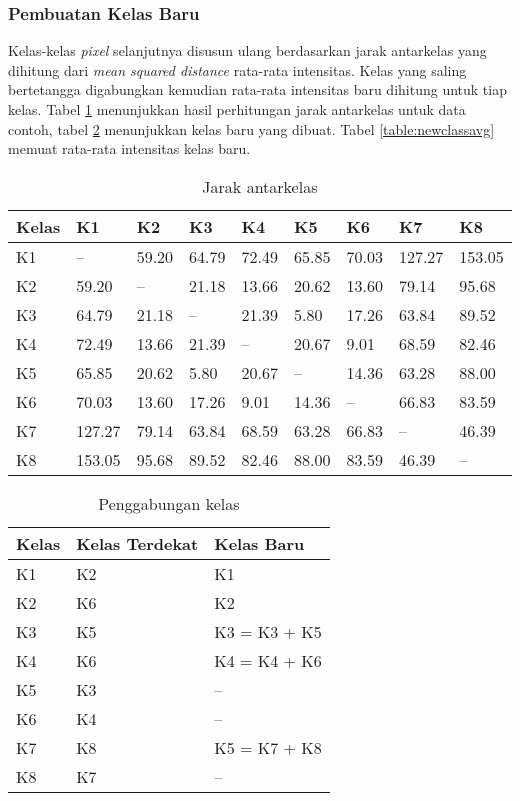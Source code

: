 \documentclass[laporan.tex]{subfiles}
\begin{document}
\subsubsection{Pembuatan Kelas Baru}

Kelas-kelas \emph{pixel} selanjutnya disusun ulang berdasarkan jarak antarkelas yang dihitung dari \emph{mean squared distance} rata-rata intensitas. Kelas yang saling bertetangga digabungkan kemudian rata-rata intensitas baru dihitung untuk tiap kelas. Tabel \ref{table:clsdist} menunjukkan hasil perhitungan jarak antarkelas untuk data contoh, tabel \ref{table:newclass} menunjukkan kelas baru yang dibuat. Tabel \ref{table:newclassavg} memuat rata-rata intensitas kelas baru.


\begin{table}[h]
\centering
\begin{tabular}{|l|l|l|l|l|l|l|l|l|}
\hline
Kelas & K1 & K2 & K3 & K4 & K5 & K6 & K7 & K8 \\
\hline
K1 & -- & 59.20 & 64.79 & 72.49 & 65.85 & 70.03 & 127.27 & 153.05 \\
K2 & 59.20 & -- & 21.18 & 13.66 & 20.62 & 13.60 & 79.14 & 95.68 \\
K3 & 64.79 & 21.18 & --	& 21.39 & 5.80 & 17.26 & 63.84 & 89.52 \\
K4 & 72.49 & 13.66 & 21.39 & --	& 20.67 & 9.01 & 68.59 & 82.46 \\
K5 & 65.85 & 20.62 & 5.80 & 20.67 & -- & 14.36 & 63.28 & 88.00 \\
K6 & 70.03 & 13.60 & 17.26 & 9.01 & 14.36 & -- & 66.83 & 83.59 \\
K7 & 127.27 & 79.14 & 63.84 & 68.59 & 63.28 & 66.83 & -- & 46.39 \\
K8 & 153.05 & 95.68 & 89.52 & 82.46 & 88.00 & 83.59 & 46.39 & -- \\
\hline
\end{tabular}
\caption{Jarak antarkelas}
\label{table:clsdist}
\end{table}

\begin{table}[h]
\centering
\begin{tabular}{|l|l|l|}
\hline
Kelas & Kelas Terdekat & Kelas Baru \\
\hline
K1 & K2 & K1 \\
K2 & K6 & K2 \\
K3 & K5 & K3 = K3 + K5 \\
K4 & K6 & K4 = K4 + K6 \\
K5 & K3 & -- \\
K6 & K4 & -- \\
K7 & K8 & K5 = K7 + K8 \\
K8 & K7 & -- \\
\hline
\end{tabular}
\caption{Penggabungan kelas}
\label{table:newclass}
\end{table}
\end{document}
